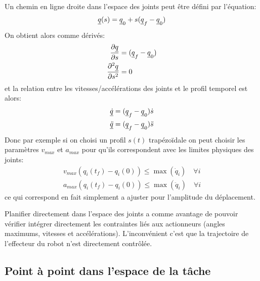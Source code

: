 Un chemin en ligne droite dans l'espace des joints peut être défini par l'équation:
\begin{align}
  \underline{q}(s) = \underline{q}_0 + s ( \underline{q}_f - \underline{q}_0 )
\end{align}
On obtient alors comme dérivés:
\begin{align}
  \frac{\partial \underline{q}}{ \partial s}  &= ( \underline{q}_f - \underline{q}_0 )
  \\
  \frac{\partial^2 \underline{q}}{ \partial s^2} &= 0
\end{align}
et la relation entre les vitesses/accélérations des joints et le profil temporel est alors:
\begin{align}
  \underline{\dot{q}} &= ( \underline{q}_f - \underline{q}_0 ) \dot{s}
  \\
  \underline{\ddot{q}} &= ( \underline{q}_f - \underline{q}_0 ) \ddot{s}
\end{align}
Donc par exemple si on choisi un profil $s(t)$ trapézoïdale on peut choisir les paramètres $v_{max}$ et $a_{max}$ pour qu'ils correspondent avec les limites physiques des joints:
\begin{align}
  v_{max} \left( q_i(t_f) - q_i(0) \right)  \leq \max(\dot{q}_i) \quad \forall i
  \\
  a_{max} \left( q_i(t_f) - q_i(0) \right) \leq \max(\ddot{q}_i) \quad \forall i
\end{align}
ce qui correspond en fait simplement a ajuster pour l'amplitude du déplacement.

Planifier directement dans l'espace des joints a comme avantage de pouvoir vérifier intégrer directement les contraintes liés aux actionneurs (angles maximums, vitesses et accélérations). L'inconvénient c'est que la trajectoire de l'effecteur du robot n'est directement contrôlée.


\subsection{Point à point dans l'espace de la tâche}

